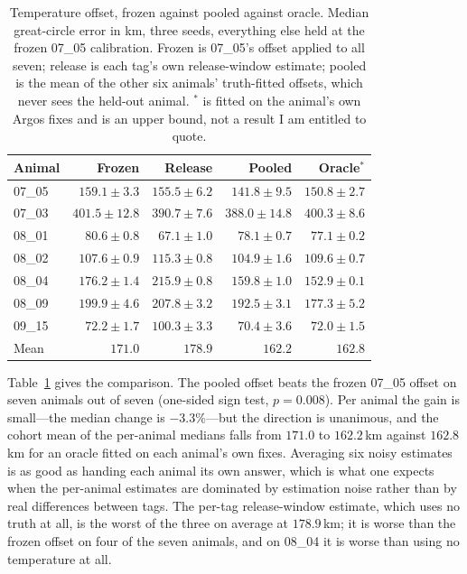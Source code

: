 \documentclass[conference]{IEEEtran}
\begin{document}
\begin{table}[t]
\caption{Temperature offset, frozen against pooled against oracle. Median
great-circle error in \si{\km}, three seeds, everything else held at the frozen
07\_05 calibration. Frozen is 07\_05's offset applied to all seven; release is each tag's own
release-window estimate; pooled is the mean of the other six animals'
truth-fitted offsets, which never sees the held-out animal. $^{*}$ is fitted on the animal's own Argos fixes and is an
upper bound, not a result I am entitled to quote.}
\label{tab:loo}
\centering
\footnotesize
\setlength{\tabcolsep}{4pt}
\begin{tabular}{@{}lrrrr@{}}
\toprule
Animal & Frozen & Release & Pooled & Oracle$^{*}$ \\
\midrule
07\_05 & $159.1 \pm 3.3$  & $155.5 \pm 6.2$  & $141.8 \pm 9.5$  & $150.8 \pm 2.7$  \\
07\_03 & $401.5 \pm 12.8$ & $390.7 \pm 7.6$  & $388.0 \pm 14.8$ & $400.3 \pm 8.6$  \\
08\_01 & $80.6 \pm 0.8$   & $67.1 \pm 1.0$   & $78.1 \pm 0.7$   & $77.1 \pm 0.2$   \\
08\_02 & $107.6 \pm 0.9$  & $115.3 \pm 0.8$  & $104.9 \pm 1.6$  & $109.6 \pm 0.7$  \\
08\_04 & $176.2 \pm 1.4$  & $215.9 \pm 0.8$  & $159.8 \pm 1.0$  & $152.9 \pm 0.1$  \\
08\_09 & $199.9 \pm 4.6$  & $207.8 \pm 3.2$  & $192.5 \pm 3.1$  & $177.3 \pm 5.2$  \\
09\_15 & $72.2 \pm 1.7$   & $100.3 \pm 3.3$  & $70.4 \pm 3.6$   & $72.0 \pm 1.5$   \\
\midrule
Mean   & $171.0$ & $178.9$ & $162.2$ & $162.8$ \\
\bottomrule
\end{tabular}
\end{table}

Table~\ref{tab:loo} gives the comparison. The pooled offset beats the frozen
07\_05 offset on seven animals out of seven (one-sided sign test,
$p = 0.008$). Per animal the gain is small---the median
change is $-3.3\%$---but the direction is unanimous, and the cohort mean of the
per-animal medians falls from $171.0$ to $162.2$\,\si{\km} against
$162.8$\,\si{\km} for an oracle fitted on each animal's own fixes. Averaging
six noisy estimates is as good as handing each animal its own answer, which is
what one expects when the per-animal estimates are dominated by estimation noise
rather than by real differences between tags. The per-tag release-window
estimate, which uses no truth at all, is the worst of the three on average at
$178.9$\,\si{\km}; it is worse than the frozen offset on four of the seven
animals, and on 08\_04 it is worse than using no temperature at all.
\end{document}
